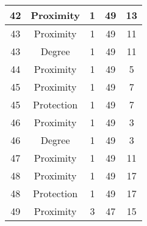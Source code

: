 \documentclass[results.tex]{subfiles}
\begin{document}
\begin{center}
\begin{tabular}{| c || c | c | c | c |}
            \hline
            42                      & Proximity                    & 1                      & 49                      & 13                   \\
            \hline
            43                      & Proximity                    & 1                      & 49                      & 11                   \\
            \hline
            43                      & Degree                       & 1                      & 49                      & 11                   \\
            \hline
            44                      & Proximity                    & 1                      & 49                      & 5                    \\
            \hline
            45                      & Proximity                    & 1                      & 49                      & 7                    \\
            \hline
            45                      & Protection                   & 1                      & 49                      & 7                    \\
            \hline
            46                      & Proximity                    & 1                      & 49                      & 3                    \\
            \hline
            46                      & Degree                       & 1                      & 49                      & 3                    \\
            \hline
            47                      & Proximity                    & 1                      & 49                      & 11                   \\
            \hline
            48                      & Proximity                    & 1                      & 49                      & 17                   \\
            \hline
            48                      & Protection                   & 1                      & 49                      & 17                   \\
            \hline
            49                      & Proximity                    & 3                      & 47                      & 15                   \\
            \hline
        \end{tabular}
    \end{center}
\end{document}
